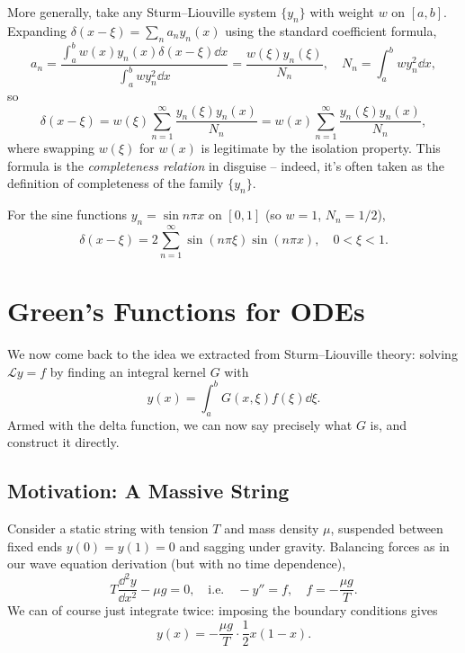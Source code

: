 \documentclass[a4paper]{scrartcl}
\begin{document}
More generally, take any Sturm--Liouville system $\{y_n\}$ with weight $w$ on $[a, b]$. Expanding $\delta(x - \xi) = \sum_n a_n y_n(x)$ using the standard coefficient formula,
$$
a_n = \frac{\int_a^b w(x) y_n(x) \delta(x - \xi) \dd x}{\int_a^b w y_n^2 \dd x} = \frac{w(\xi) y_n(\xi)}{N_n}, \quad N_n = \int_a^b w y_n^2 \dd x,
$$
so
$$
\delta(x - \xi) = w(\xi) \sum_{n = 1}^{\infty} \frac{y_n(\xi) y_n(x)}{N_n} = w(x) \sum_{n = 1}^{\infty} \frac{y_n(\xi) y_n(x)}{N_n},
$$
where swapping $w(\xi)$ for $w(x)$ is legitimate by the isolation property. This formula is the \emph{completeness relation} in disguise -- indeed, it's often taken as the definition of completeness of the family $\{y_n\}$.

\begin{example}
    For the sine functions $y_n = \sin n \pi x$ on $[0, 1]$ (so $w = 1$, $N_n = 1/2$),
    $$
    \delta(x - \xi) = 2 \sum_{n = 1}^{\infty} \sin (n \pi \xi) \sin (n \pi x), \quad 0 < \xi < 1.
    $$
\end{example}

\section{Green's Functions for ODEs}

We now come back to the idea we extracted from Sturm--Liouville theory: solving $\mathcal{L} y = f$ by finding an integral kernel $G$ with
$$
y(x) = \int_a^b G(x, \xi) f(\xi) \dd \xi.
$$
Armed with the delta function, we can now say precisely what $G$ is, and construct it directly.

\subsection{Motivation: A Massive String}

Consider a static string with tension $T$ and mass density $\mu$, suspended between fixed ends $y(0) = y(1) = 0$ and sagging under gravity. Balancing forces as in our wave equation derivation (but with no time dependence),
$$
T \frac{\dd^2 y}{\dd x^2} - \mu g = 0, \quad \text{i.e.} \quad -y'' = f, \quad f = -\frac{\mu g}{T}.
$$
We can of course just integrate twice: imposing the boundary conditions gives
$$
y(x) = -\frac{\mu g}{T}\cdot \frac{1}{2}x (1 - x).
$$
\end{document}
